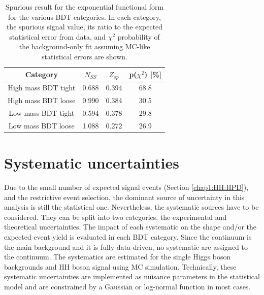 \begin{table}[]
    \centering
    \begin{tabular}{cccc}
    \hline\hline
       Category  & $N_{SS}$ & $Z_{sp}$ & p($\chi^2$) [\%] \\
       \hline
       High mass BDT tight &  0.688 & 0.394 & 68.8 \\
       High mass BDT loose &  0.990 & 0.384 & 30.5 \\
       Low mass BDT tight  &  0.594 & 0.378 & 29.8 \\
       Low mass BDT loose  & 1.088  & 0.272 & 26.9 \\
       \hline\hline
    \end{tabular}
    \caption{Spurious result for the exponential functional form for the various BDT categories. In each category, the spurious signal value, its ratio to the expected statistical error from data, and $\chi^2$ probability of the background-only fit assuming MC-like statistical errors are shown.}
    \label{tab:HHyybb:Modelling:Bkg:SS}
\end{table}

\section{Systematic uncertainties}
\label{HHyybb:Syst}
Due to the small number of expected signal events (Section \ref{chap1:HH:HPD}), and the restrictive event selection, the dominant source of uncertainty in this analysis is still the statistical one. Nevertheless, the systematic sources have to be considered. They can be split into two categories, the experimental and theoretical uncertainties. The impact of each systematic on the shape and/or the expected event yield is evaluated in each BDT category. Since the continuum is the main background and it is fully data-driven, no systematic are assigned to the continuum. The systematics are estimated for the single Higgs boson backgrounds and HH boson signal using MC simulation. Technically, these systematic uncertainties are implemented as nuisance parameters in the statistical model and are constrained by a Gaussian or log-normal function in most cases. 
